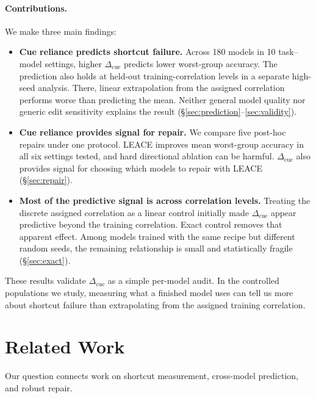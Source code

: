\documentclass[11pt]{article}
\newcommand{\cued}{\ensuremath{\Delta_{\mathrm{cue}}}}
\begin{document}
\paragraph{Contributions.}
We make three main findings:
\begin{itemize}
    \setlength{\itemsep}{8pt}
    \setlength{\parskip}{0pt}
    \setlength{\parsep}{0pt}

    \item \textbf{Cue reliance predicts shortcut failure.}
    Across 180 models in 10 task--model settings, higher \cued{} predicts lower
    worst-group accuracy. The prediction also holds at held-out training-correlation levels in a separate high-seed analysis. There, linear extrapolation from the assigned correlation performs worse than predicting the mean. Neither general model quality nor generic edit sensitivity explains the result (\S\ref{sec:prediction}--\ref{sec:validity}).

    \item \textbf{Cue reliance provides signal for repair.}
    We compare five post-hoc repairs under one protocol. LEACE improves mean
    worst-group accuracy in all six settings tested, and hard directional
    ablation can be harmful. \cued{} also provides signal for choosing which
    models to repair with LEACE (\S\ref{sec:repair}).

    \item \textbf{Most of the predictive signal is across correlation levels.}
    Treating the discrete assigned correlation as a linear control initially
    made \cued{} appear predictive beyond the training correlation. Exact control removes that apparent effect. Among models trained with
    the same recipe but different random seeds, the remaining relationship is
    small and statistically fragile (\S\ref{sec:exact}).
\end{itemize}

These results validate \cued{} as a simple per-model audit. In the controlled
populations we study, measuring what a finished model uses can tell us more
about shortcut failure than extrapolating from the assigned training
correlation.


\section{Related Work}
\label{sec:related}

Our question connects work on shortcut measurement, cross-model prediction, and
robust repair.
\end{document}
